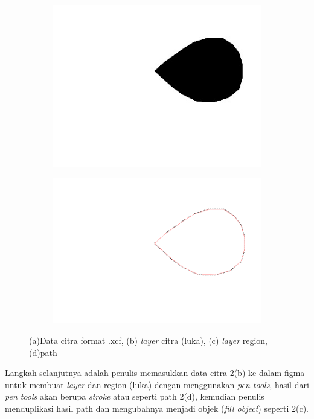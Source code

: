 \begin{figure}[H]
\begin{subfigure}{0.2\textwidth}
		\caption{}
	  \end{subfigure}  
	  \begin{subfigure}{0.2\textwidth}
		\centering{}
		\includegraphics[width=\textwidth]{gambar/gambar-3_2(c).jpg}
		\caption{}
	  \end{subfigure}
	  \begin{subfigure}{0.2\textwidth}
		\centering{}
		\includegraphics[width=\textwidth]{gambar/gambar-3_2(d).png}
		\caption{}
	  \end{subfigure}  
	\caption{
		(a)Data citra format .xcf, (b) \emph{layer} citra (luka), (c) \emph{layer} 
		region, (d)path
	 }
  \end{figure}

Langkah selanjutnya adalah penulis memasukkan data citra 2(b) ke dalam figma untuk
membuat \emph{layer} dan region (luka) dengan menggunakan \emph{pen tools}, hasil 
dari \emph{pen tools} akan berupa \emph{stroke} atau seperti path 2(d), kemudian 
penulis menduplikasi hasil path dan mengubahnya menjadi objek (\emph{fill object})
seperti 2(c).


